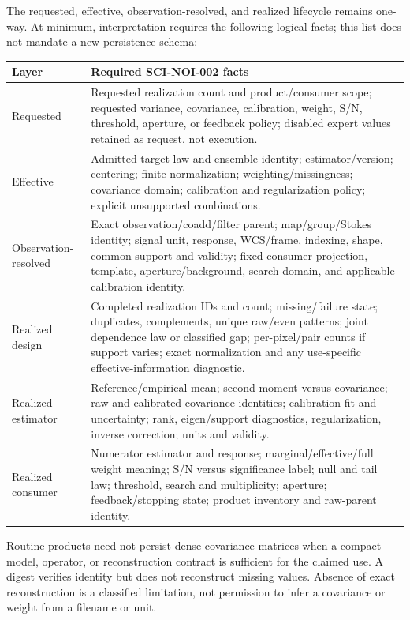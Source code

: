 \documentclass[11pt]{article}
\begin{document}
The requested, effective, observation-resolved, and realized lifecycle remains
one-way.  At minimum, interpretation requires the following logical facts;
this list does not mandate a new persistence schema:
\begin{longtable}{>{\raggedright\arraybackslash}p{}
                  >{\raggedright\arraybackslash}p{}}
\toprule
Layer & Required SCI-NOI-002 facts \\
\midrule
\endhead
Requested & Requested realization count and product/consumer scope; requested
variance, covariance, calibration, weight, S/N, threshold, aperture, or
feedback policy; disabled expert values retained as request, not execution. \\
Effective & Admitted target law and ensemble identity; estimator/version;
centering; finite normalization; weighting/missingness; covariance domain;
calibration and regularization policy; explicit unsupported combinations. \\
Observation-resolved & Exact observation/coadd/filter parent; map/group/Stokes
identity; signal unit, response, WCS/frame, indexing, shape, common support and
validity; fixed consumer projection, template, aperture/background, search
domain, and applicable calibration identity. \\
Realized design & Completed realization IDs and count; missing/failure state;
duplicates, complements, unique raw/even patterns; joint dependence law or
classified gap; per-pixel/pair counts if support varies; exact normalization
and any use-specific effective-information diagnostic. \\
Realized estimator & Reference/empirical mean; second moment versus covariance;
raw and calibrated covariance identities; calibration fit and uncertainty;
rank, eigen/support diagnostics, regularization, inverse correction; units and
validity. \\
Realized consumer & Numerator estimator and response; marginal/effective/full
weight meaning; S/N versus significance label; null and tail law; threshold,
search and multiplicity; aperture; feedback/stopping state; product inventory
and raw-parent identity. \\
\bottomrule
\end{longtable}

Routine products need not persist dense covariance matrices when a compact
model, operator, or reconstruction contract is sufficient for the claimed
use.  A digest verifies identity but does not reconstruct missing values.
Absence of exact reconstruction is a classified limitation, not permission to
infer a covariance or weight from a filename or unit.
\end{document}
